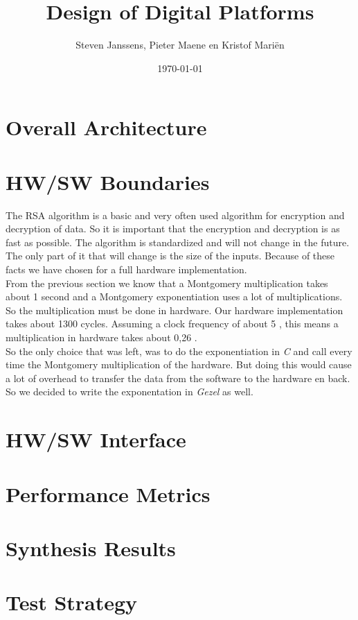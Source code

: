 \documentclass[a4paper]{article}
\title{Design of Digital Platforms}
\author{Steven Janssens, Pieter Maene en Kristof Mari\"en}
\date{\today}
\begin{document}
\maketitle

\section{Overall Architecture}

\section{HW/SW Boundaries}

The RSA algorithm is a basic and very often used algorithm for encryption and decryption of data. So it is important that the encryption and decryption is as fast as possible. The algorithm is standardized and will not change in the future. The only part of it that will change is the size of the inputs. Because of these facts we have chosen for a full hardware implementation.\\

From the previous section we know that a Montgomery multiplication takes about 1 second and a Montgomery exponentiation uses a lot of multiplications. So the multiplication must be done in hardware. Our hardware implementation takes about 1300 cycles. Assuming a clock frequency of about 5 \mega \hertz, this means a multiplication in hardware takes about 0,26 \micro \second.\\

So the only choice that was left, was to do the exponentiation in \textit{C} and call every time the Montgomery multiplication of the hardware. But doing this would cause a lot of overhead to transfer the data from the software to the hardware en back. So we decided to write the exponentation in \textit{Gezel} as well.

\section{HW/SW Interface}

\section{Performance Metrics}

\section{Synthesis Results}

\section{Test Strategy}
\end{document}
